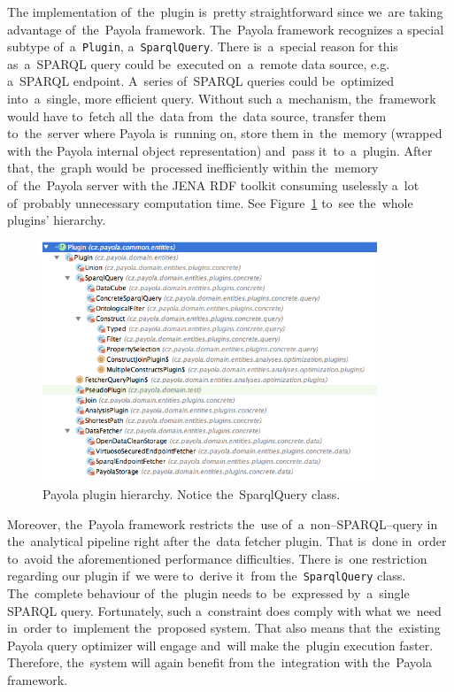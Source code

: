The implementation of~the~plugin is~pretty straightforward since we~are 
taking advantage of~the~Payola framework. The~Payola framework recognizes a
special subtype of~a~\texttt{Plugin}, a~\texttt{SparqlQuery}. There is~a~special 
reason for this as~a~SPARQL query could be~executed on~a~remote data source, 
e.g. a~SPARQL endpoint. A~series of~SPARQL queries could be~optimized into~a~single,
more efficient query. Without such a~mechanism, the~framework would
have to~fetch all the~data from~the~data source, transfer them to~the~server 
where Payola is~running on, store them in~the~memory (wrapped with
the Payola internal object representation) and~pass it~to~a~plugin. After that, the~graph would be~processed inefficiently within the~memory of~the~Payola server with 
the JENA RDF toolkit consuming uselessly a~lot of~probably unnecessary computation time. See 
Figure~\ref{fig:plugin-hierarchy} to~see the~whole plugins’ hierarchy.


\begin{figure}
	\centering
	\includegraphics[width=100mm]{img/plugin-hierarchy.png}
	\caption{Payola plugin hierarchy. Notice the~SparqlQuery class.}
	\label{fig:plugin-hierarchy}
\end{figure}

Moreover, the~Payola framework restricts the~use of~a~non--SPARQL--query 
in the~analytical pipeline right after the~data fetcher plugin. That is~done in~order to~avoid 
the aforementioned performance difficulties. There is~one restriction regarding our plugin if~we
were to~derive it~from the~\texttt{SparqlQuery} class. The~complete behaviour of~the~plugin needs to~be~expressed by~a~single SPARQL query. Fortunately, such a~constraint does 
comply with what we~need in~order to~implement the~proposed system. That also means
that the~existing Payola query optimizer will engage and~will make the~plugin execution faster. Therefore, the~system will again 
benefit from the~integration with the~Payola framework.

